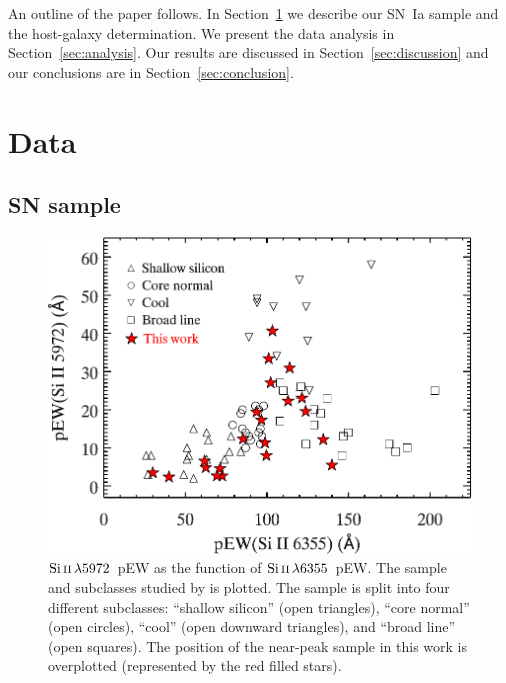 \documentclass[useAMS,usenatbib]{mn2e}
\newcommand{\Siii}{\ensuremath{\mathrm{Si}\,\textsc{ii}\,\lambda6355}}
\newcommand{\Siiitmp}{\ensuremath{\mathrm{Si}\,\textsc{ii}\,\lambda5972}}
\begin{document}
An outline of the paper follows. In Section~\ref{sec:data} we describe our SN~Ia sample and the host-galaxy determination. We present the data analysis in Section~\ref{sec:analysis}. Our results are discussed in Section~\ref{sec:discussion} and our conclusions are in Section~\ref{sec:conclusion}.

\section{Data}
\label{sec:data}
\subsection{SN sample}
\label{sec:sample}
\begin{figure}
	\centering
		\includegraphics[scale=0.51]{plot/swift_subclass_branch.pdf}
		\caption{\Siiitmp\ pEW as the function of \Siii\ pEW.
               The sample and subclasses studied by \citet{2009PASP..121..238B}
               is plotted. The sample is split into four
               different subclasses: ``shallow silicon'' (open triangles),
               ``core normal'' (open circles), ``cool'' (open downward triangles),
               and ``broad line'' (open squares). The position of the near-peak sample
               in this work is overplotted (represented by the red filled stars).}
        \label{spec_subclass}
\end{figure}
\end{document}
